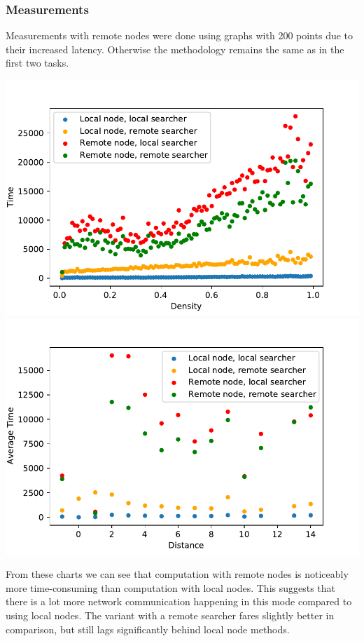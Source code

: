 \documentclass{scrartcl}
\begin{document}
    \subsubsection*{Measurements}
    Measurements with remote nodes were done using graphs with 200 points due to their increased latency. Otherwise the methodology remains the same as in the first two tasks.
    \begin{center}
        \includegraphics[width=0.8\linewidth]{picture34.pdf}
        \includegraphics[width=0.8\linewidth]{picture34_dist.pdf}
    \end{center}
    From these charts we can see that computation with remote nodes is noticeably more time-consuming than computation with local nodes. This suggests that there is a lot more network communication happening in this mode compared to using local nodes. The variant with a remote searcher fares slightly better in comparison, but still lags significantly behind local node methods.
\end{document}
